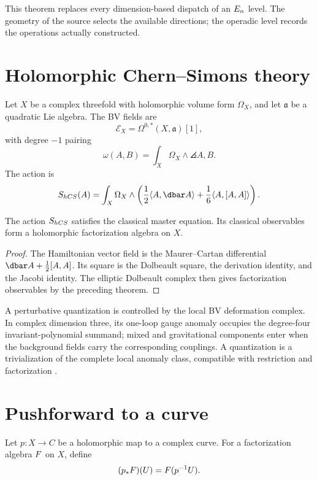 This theorem replaces every dimension-based dispatch of an $E_n$ level.  The geometry of the source selects the available directions; the operadic level records the operations actually constructed.

\chapter{Holomorphic Chern--Simons theory}
Let $X$ be a complex threefold with holomorphic volume form $\Omega_X$, and let $\mathfrak a$ be a quadratic Lie algebra. The BV fields are
\[
 \mathcal E_X=\Omega^{0,*}(X,\mathfrak a)[1],
\]
with degree $-1$ pairing
\[
 \omega(A,B)=\int_X\Omega_X\wedge\angles{A,B}.
\]
The action is
\[
 S_{\hCS}(A)=\int_X\Omega_X\wedge
 \left(\frac12\angles{A,\dbar A}+\frac16\angles{A,[A,A]}\right).
\]

\begin{theorem}
The action $S_{hCS}$ satisfies the classical master equation. Its classical observables form a holomorphic factorization algebra on $X$.
\end{theorem}
\begin{proof}
The Hamiltonian vector field is the Maurer--Cartan differential $\dbar A+\frac12[A,A]$. Its square is the Dolbeault square, the derivation identity, and the Jacobi identity. The elliptic Dolbeault complex then gives factorization observables by the preceding theorem.
\end{proof}

A perturbative quantization is controlled by the local BV deformation complex. In complex dimension three, its one-loop gauge anomaly occupies the degree-four invariant-polynomial summand; mixed and gravitational components enter when the background fields carry the corresponding couplings. A quantization is a trivialization of the complete local anomaly class, compatible with restriction and factorization \cite{CostelloLiAnomaly}.

\chapter{Pushforward to a curve}
Let $p:X\to C$ be a holomorphic map to a complex curve. For a factorization algebra $F$ on $X$, define
\[
 (p_*F)(U)=F(p^{-1}U).
\]

